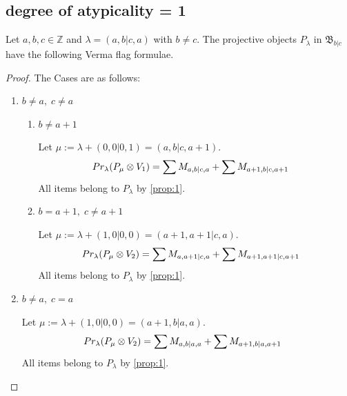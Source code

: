 
\subsection{degree of atypicality = 1}

\begin{theorem}
  Let $a,b,c \in \mathbb{Z}$ and $\lambda = (a,b|c,a)$ with $b \neq c$. The projective objects $P_{\lambda}$ in $\mathfrak{B}_{b|c}$ have the following Verma flag formulae.
\end{theorem}
\begin{proof} The Cases are as follows:\par
\begin{enumerate}
  \item $ b \neq a,\; c \neq a $
    \begin{enumerate}
      \item $ b \neq a+1 $ \par 
        Let $\mu:=\lambda + (0,0|0,1) = (a,b|c,a+1) $.
        \begin{equation}\notag
          \begin{aligned}
            Pr_{\lambda}(P_\mu \otimes V_{1}) &=
\sum M_{a,b|c,a}
+ \sum M_{a+1,b|c,a+1}
          \end{aligned}
        \end{equation}
All items belong to $P_\lambda$ by \cref{prop:1}.

      \item $ b = a+1,\; c \neq a+1 $ \par 
        Let $\mu:=\lambda + (1,0|0,0) = (a+1,a+1|c,a) $.
        \begin{equation}\notag
          \begin{aligned}
            Pr_{\lambda}(P_\mu \otimes V_{2}) &=
\sum M_{a,a+1|c,a}
+ \sum M_{a+1,a+1|c,a+1}
          \end{aligned}
        \end{equation}
All items belong to $P_\lambda$ by \cref{prop:1}.

    \end{enumerate}

  \item $ b \neq a,\; c = a $ \par
      Let $\mu:=\lambda + (1,0|0,0) = (a+1,b|a,a) $.
      \begin{equation}\notag
        \begin{aligned}
          Pr_{\lambda}(P_\mu \otimes V_{2}) &=
\sum M_{a,b|a,a}
+ \sum M_{a+1,b|a,a+1}
        \end{aligned}
      \end{equation}
All items belong to $P_\lambda$ by \cref{prop:1}.



\end{enumerate}
\end{proof}
